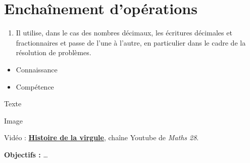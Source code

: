 \documentclass[nocrop]{sesamanuel_college_5e_new}
\begin{document}
\frontmatter
{}
%

\mainmatter

\themaN

\chapter{Enchaînement d'opérations}
\label{S01}

\begin{autoeval}
   \small
   \begin{enumerate}
      \item Il utilise, dans le cas des nombres décimaux, les écritures décimales et fractionnaires et passe de l’une à l’autre, en particulier dans le cadre de la résolution de problèmes.
   \end{enumerate}
\end{autoeval}


\begin{prerequis}
   \small
   \begin{itemize}
      \item Connaissance
      \item[\com] Compétence
   \end{itemize}
\end{prerequis}

\vfill

\begin{debat}
   Texte\medskip
   \begin{center}
      Image
   \end{center} \medskip
   \begin{cadre}[B2][J4]
      \begin{center}
         Vidéo : \href{https://www.youtube.com/watch?v=bkGMa1EJkSA}{\bf Histoire de la virgule}, chaîne Youtube de {\it Maths 28}.
      \end{center}
   \end{cadre}
\end{debat}


\activites

\begin{activite}
   {\bf Objectifs :} \dots
   \begin{QCM}
      \vspace*{18cm}
   \end{QCM}
\end{activite}
\end{document}
